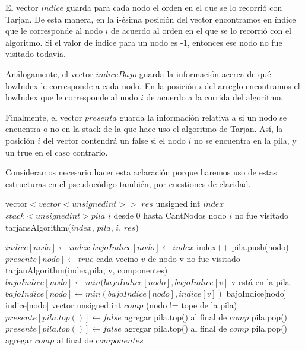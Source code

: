 \quad El vector $indice$ guarda para cada nodo el orden en el que se lo recorrió con Tarjan. De esta manera, en la i-ésima posición del vector encontramos en índice que le corresponde al nodo $i$ de acuerdo al orden en el que se lo recorrió con el algoritmo. Si el valor de indice para un nodo es -1, entonces ese nodo no fue visitado todavía.

\quad Análogamente, el vector $indiceBajo$ guarda la información acerca de qué lowIndex le corresponde a cada nodo. En la posición $i$ del arreglo encontramos el lowIndex que le corresponde al nodo $i$ de acuerdo a la corrida del algoritmo.

\quad Finalmente, el vector $presenta$ guarda la información relativa a si un nodo se encuentra o no en la stack de la que hace uso el algoritmo de Tarjan. Así, la posición $i$ del vector contendrá un false si el nodo $i$ no se encuentra en la pila, y un true en el caso contrario.

\quad Consideramos necesario hacer esta aclaración porque haremos uso de estas estructuras en el pseudocódigo también, por cuestiones de claridad.





\begin{algorithm}[H]
\caption{} 
\begin{codebox}
\li vector$<vector<unsigned int>>$ $res$
\li unsigned int $index$
\li $stack<unsigned int> pila$
\li
\li \For $i$ desde 0 hasta CantNodos \Do
\li	\If nodo $i$ no fue visitado \Do
\li	tarjansAlgorithm($index$, $pila$, $i$, $res$)
	\End	
    \End
\End
\end{codebox}
\end{algorithm}


\begin{algorithm}[H]
\caption{} 
\begin{codebox}
\li $indice[nodo] \gets index$
\li $bajoIndice[nodo] \gets index$
\li index++
\li pila.push(nodo)
\li $presente[nodo] \gets true$
\li 	 
\li \For cada vecino $v$ de nodo \Do
\li 	\If v no fue visitado \Do
\li		tarjanAlgorithm(index,pila, v, componentes)
\li		$bajoIndice[nodo] \gets min(bajoIndice[nodo], bajoIndice[v]$
\li	\Else 
\li		\If v está en la pila \Do
\li			$bajoIndice[nodo] \gets min(bajoIndice[nodo], indice[v])$
		\End
	\End
    \End
\li
\li \If bajoIndice[nodo]== indice[nodo] \Do
\li	vector unsigned int $comp$
\li 	\While (nodo != tope de la pila) \Do
\li		$presente[pila.top()] \gets false$
\li		agregar pila.top() al final de $comp$
\li		pila.pop()
	\End
\li	$presente[pila.top()] \gets false$
\li	agregar pila.top() al final de $comp$
\li	pila.pop()
\li 	agregar $comp$ al final de $componentes$		
 \End
\End
\end{codebox}
\end{algorithm}


